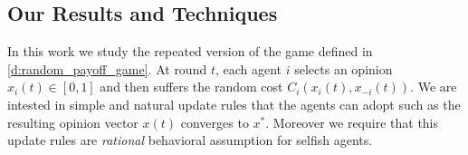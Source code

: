 
\subsection{Our Results and Techniques}

In this work we study the repeated version of the game defined in \ref{d:random_payoff_game}.
At round $t$, each agent $i$ selects an opinion $x_i(t) \in [0,1]$ and then suffers the 
random cost $C_i(x_i(t),x_{-i}(t))$. We are intested in simple and natural update rules
that the agents can adopt such as the resulting opinion vector $x(t)$ converges to $x^*$.
Moreover we require that this update rules are \emph{rational} behavioral assumption for 
selfish agents.

